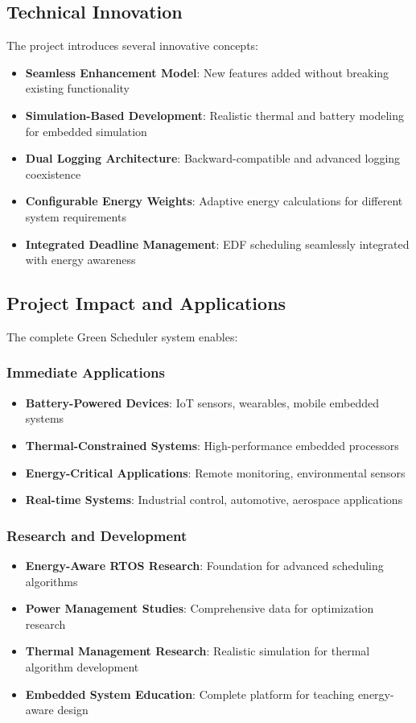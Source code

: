 \documentclass[11pt,a4paper]{article}
\begin{document}
\subsection{Technical Innovation}
The project introduces several innovative concepts:
\begin{itemize}
    \item \textbf{Seamless Enhancement Model}: New features added without breaking existing functionality
    \item \textbf{Simulation-Based Development}: Realistic thermal and battery modeling for embedded simulation
    \item \textbf{Dual Logging Architecture}: Backward-compatible and advanced logging coexistence
    \item \textbf{Configurable Energy Weights}: Adaptive energy calculations for different system requirements
    \item \textbf{Integrated Deadline Management}: EDF scheduling seamlessly integrated with energy awareness
\end{itemize}

\subsection{Project Impact and Applications}
The complete Green Scheduler system enables:

\subsubsection{Immediate Applications}
\begin{itemize}
    \item \textbf{Battery-Powered Devices}: IoT sensors, wearables, mobile embedded systems
    \item \textbf{Thermal-Constrained Systems}: High-performance embedded processors
    \item \textbf{Energy-Critical Applications}: Remote monitoring, environmental sensors
    \item \textbf{Real-time Systems}: Industrial control, automotive, aerospace applications
\end{itemize}

\subsubsection{Research and Development}
\begin{itemize}
    \item \textbf{Energy-Aware RTOS Research}: Foundation for advanced scheduling algorithms
    \item \textbf{Power Management Studies}: Comprehensive data for optimization research
    \item \textbf{Thermal Management Research}: Realistic simulation for thermal algorithm development
    \item \textbf{Embedded System Education}: Complete platform for teaching energy-aware design
\end{itemize}
\end{document}
